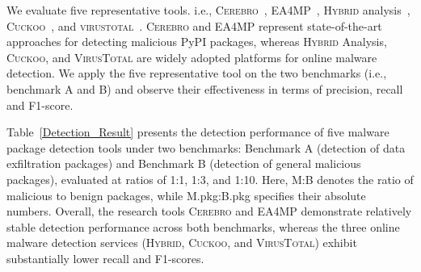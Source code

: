 We evaluate five representative tools. i.e., \textsc{Cerebro}~\cite{zhang2025killing},  \textsc{EA4MP}~\cite{sun2024integrating}, \textsc{Hybrid} analysis~\cite{hybrid}, \textsc{Cuckoo}~\cite{cuckoo}, and \textsc{virustotal}~\cite{VirusTotal}. \textsc{Cerebro} and \textsc{EA4MP} represent state-of-the-art approaches for detecting malicious PyPI packages, whereas \textsc{Hybrid} Analysis, \textsc{Cuckoo}, and \textsc{VirusTotal} are widely adopted platforms for online malware detection. We apply the five representative tool on the two benchmarks (i.e., benchmark A and B) and observe their effectiveness in terms of precision, recall and F1-score. 


Table~\ref{Detection_Result} presents the detection performance of five malware package detection tools under two benchmarks: Benchmark A (detection of data exfiltration packages) and Benchmark B (detection of general malicious packages), evaluated at ratios of 1:1, 1:3, and 1:10. Here, M:B denotes the ratio of malicious to benign packages, while M.pkg:B.pkg specifies their absolute numbers. Overall, the research tools \textsc{Cerebro} and \textsc{EA4MP} demonstrate relatively stable detection performance across both benchmarks, whereas the three online malware detection services (\textsc{Hybrid}, \textsc{Cuckoo}, and \textsc{VirusTotal}) exhibit substantially lower recall and F1-scores. 


